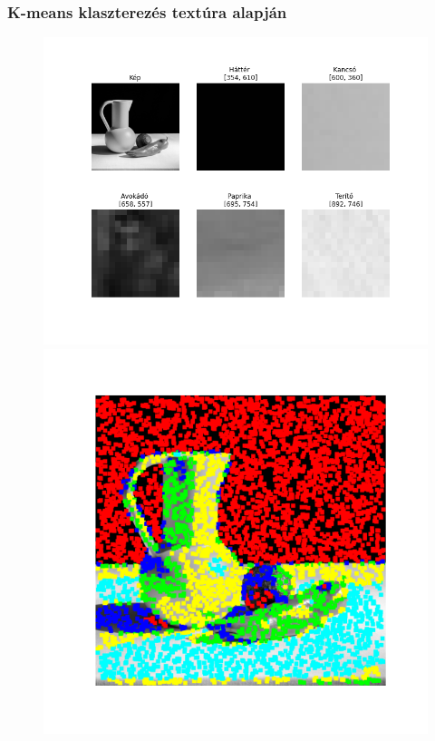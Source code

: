 \documentclass{beamer}
\begin{document}
\begin{frame}[fragile]
\frametitle{K-means klaszterezés textúra alapján}
\begin{figure}[!tbp]
  \centering
  \begin{minipage}[b]{0.5\textwidth}
    \includegraphics[width=\textwidth]{images/window_example.png}
  \end{minipage}
  \hfill
  \begin{minipage}[b]{0.4\textwidth}
    \includegraphics[width=\textwidth]{images/window_colorized.png}
  \end{minipage}
\end{figure}
\end{frame}
\end{document}
